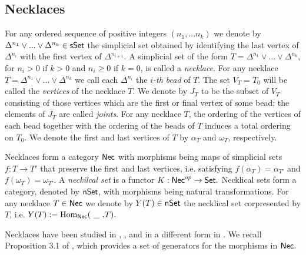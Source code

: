
\subsection{Necklaces} For any ordered sequence of positive integers $(n_1,...n_k)$ we denote by $\Delta^{n_1} \vee...\vee \Delta^{n_k} \in \mathsf{sSet}$ the simplicial set obtained by identifying the last vertex of $\Delta^{n_i}$ with the first vertex of $\Delta^{n_{i+1}}.$ A simplicial set of the form $T=\Delta^{n_1} \vee...\vee \Delta^{n_k}$, for $n_i>0$ if $k>0$ and $n_i \geq 0$ if $k=0$, is called a \textit{necklace}. For any necklace $T= \Delta^{n_1} \vee...\vee \Delta^{n_k}$ we call each $\Delta^{n_i}$ the \textit{$i$-th bead} of $T$. The set $V_T=T_0$ will be called the \textit{vertices} of the necklace $T$. We denote by $J_T$ to be the subset of $V_T$ consisting of those vertices which are the first or final vertex of some bead; the elements of $J_T$ are called \textit{joints}. For any necklace $T$, the ordering of the vertices of each bead together with the ordering of the beads of $T$ induces a total ordering on $T_0.$ We denote the first and last vertices of $T$ by $\alpha_T$ and $\omega_T$, respectively. 

Necklaces form a category $\mathsf{Nec}$ with morphisms being maps of simplicial sets $f: T \to T'$ that preserve the first and last vertices, i.e. satisfying $f(\alpha_T)=\alpha_{T'}$ and $f(\omega_T)=\omega_{T'}.$ A \textit{neckilcal set} is a functor $K: \mathsf{Nec}^{op} \to \mathsf{Set}.$ Necklical sets form a category, denoted by $\mathsf{nSet}$, with morphisms being natural transformations. For any necklace $T \in \mathsf{Nec}$ we denote by $Y(T)\in \mathsf{nSet}$ the necklical set corpresented by $T$, i.e. $Y(T):=\mathrm{Hom}_{\mathsf{Nec}}( \text{ \_ ,} T).$


Necklaces have been studied in \cite{Dugger and Spivak}, \cite{Rivera and Zeinalian}, and in a different form in \cite{Baues}. We recall Proposition 3.1 of \cite{Rivera and Zeinalian, cubical rigidification}, which provides a set of generators for the morphisms in $\mathsf{Nec}.$

